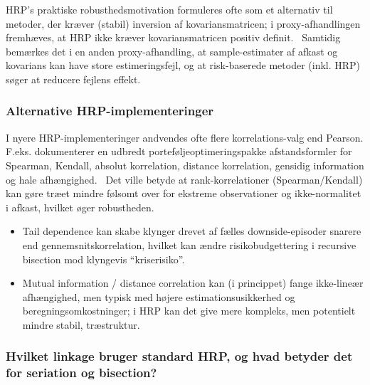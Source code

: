 \documentclass[../main.tex]{subfiles}
\begin{document}
HRP's praktiske robusthedsmotivation formuleres ofte som et alternativ til metoder, der kræver (stabil) inversion af kovariansmatricen; i proxy-afhandlingen fremhæves, at HRP ikke kræver kovariansmatricen positiv definit.~\cite{kaae_karppinen_hierarchical_2022} Samtidig bemærkes det i en anden proxy-afhandling, at sample-estimater af afkast og kovarians kan have store estimeringsfejl, og at risk-baserede metoder (inkl. HRP) søger at reducere fejlens effekt.~\cite{jensen_brix_modern_2023}

\subsubsection{Alternative HRP-implementeringer}

I nyere HRP-implementeringer andvendes ofte flere korrelations-valg end Pearson. F.eks. dokumenterer en udbredt porteføljeoptimeringspakke afstandsformler for Spearman, Kendall, absolut korrelation, distance korrelation, gensidig information og hale afhængighed.~\cite{cajas_hcportfolio_nodate} Det ville betyde at rank-korrelationer (Spearman/Kendall) kan gøre træet mindre følsomt over for ekstreme observationer og ikke-normalitet i afkast, hvilket øger robustheden.

\begin{itemize}
    \item Tail dependence kan skabe klynger drevet af fælles downside-episoder snarere end gennemsnitskorrelation, hvilket kan ændre risikobudgettering i recursive bisection mod klyngevis ``kriserisiko''.~\cite{cajas_hcportfolio_nodate}
    \item Mutual information / distance correlation kan (i princippet) fange ikke-lineær afhængighed, men typisk med højere estimationsusikkerhed og beregningsomkostninger; i HRP kan det give mere kompleks, men potentielt mindre stabil, træstruktur.~\cite{cajas_hcportfolio_nodate}
\end{itemize}
\subsubsection{Hvilket linkage bruger standard HRP, og hvad betyder det for seriation og bisection?}
\end{document}
